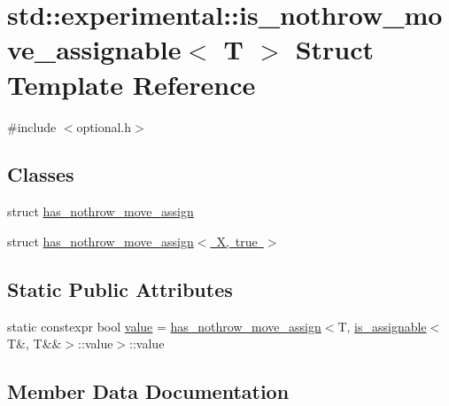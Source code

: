 \hypertarget{structstd_1_1experimental_1_1is__nothrow__move__assignable}{}\section{std\+:\+:experimental\+:\+:is\+\_\+nothrow\+\_\+move\+\_\+assignable$<$ T $>$ Struct Template Reference}
\label{structstd_1_1experimental_1_1is__nothrow__move__assignable}


{\ttfamily \#include $<$optional.\+h$>$}

\subsection*{Classes}
\begin{DoxyCompactItemize}
\item 
struct \mbox{\hyperlink{structstd_1_1experimental_1_1is__nothrow__move__assignable_1_1has__nothrow__move__assign}{has\+\_\+nothrow\+\_\+move\+\_\+assign}}
\item 
struct \mbox{\hyperlink{structstd_1_1experimental_1_1is__nothrow__move__assignable_1_1has__nothrow__move__assign_3_01_x_00_01true_01_4}{has\+\_\+nothrow\+\_\+move\+\_\+assign$<$ X, true $>$}}
\end{DoxyCompactItemize}
\subsection*{Static Public Attributes}
\begin{DoxyCompactItemize}
\item 
static constexpr bool \mbox{\hyperlink{structstd_1_1experimental_1_1is__nothrow__move__assignable_a5cbdeed533da482b9f8191d79ab47270}{value}} = \mbox{\hyperlink{structstd_1_1experimental_1_1is__nothrow__move__assignable_1_1has__nothrow__move__assign}{has\+\_\+nothrow\+\_\+move\+\_\+assign}}$<$T, \mbox{\hyperlink{structstd_1_1experimental_1_1is__assignable}{is\+\_\+assignable}}$<$T\&, T\&\&$>$\+::value$>$\+::value
\end{DoxyCompactItemize}


\subsection{Member Data Documentation}
\mbox{\label{structstd_1_1experimental_1_1is__nothrow__move__assignable_a5cbdeed533da482b9f8191d79ab47270}} 
